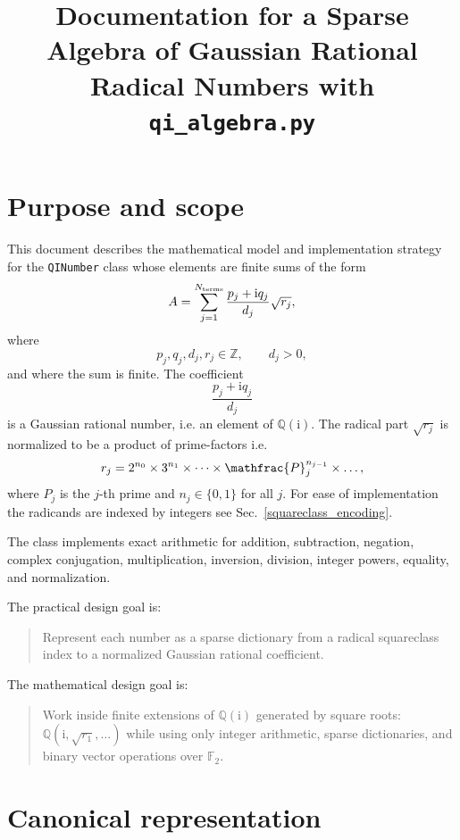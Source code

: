 \documentclass[11pt]{article}
\title{Documentation for a Sparse Algebra of Gaussian Rational Radical Numbers with \texttt{qi\_algebra.py}}
\author{}
\date{}
\newcommand{\QQ}{\mathbb{Q}}
\newcommand{\ZZ}{\mathbb{Z}}
\newcommand{\FF}{\mathbb{F}}
\newcommand{\ii}{\mathrm{i}}
\begin{document}
\maketitle

\section{Purpose and scope}

This document describes the mathematical model and implementation strategy for the \texttt{QINumber} class whose elements are finite sums of the form
\begin{equation}
  A = \sum_{j = 1}^{N_{\rm terms}} \frac{p_j + \ii q_j}{d_j}\sqrt{r_j},
\end{equation}
where
\[
  p_j,q_j,d_j,r_j \in \ZZ, \qquad d_j>0,
\]
and where the sum is finite. The coefficient
\[
  \frac{p_j+\ii q_j}{d_j}
\]
is a Gaussian rational number, i.e. an element of \(\QQ(\ii)\). The radical part \(\sqrt{r_j}\) is normalized to be a product of prime-factors i.e.
\begin{equation}
\label{eq:1}
r_j = 2^{n_{0}} \times 3^{n_1} \times \dots \times \mathfrac{P}_j^{n_{j-1}} \times \dots,
\end{equation}
where $P_j$ is the $j$-th prime and $n_{j} \in \{0, 1\}$ for all $j$. For ease of implementation the radicands are indexed by integers see Sec.~\ref{squareclass_encoding}.

The class implements exact arithmetic for addition, subtraction, negation, complex conjugation, multiplication, inversion, division, integer powers, equality, and normalization.

The practical design goal is:
\begin{quote}
Represent each number as a sparse dictionary from a radical squareclass index to a normalized Gaussian rational coefficient.
\end{quote}

The mathematical design goal is:
\begin{quote}
Work inside finite extensions of \(\QQ(\ii)\) generated by square roots: \(\QQ(\ii, \sqrt{r_1}, \dots )\) while using only integer arithmetic, sparse dictionaries, and binary vector operations over \(\FF_2\).
\end{quote}

\section{Canonical representation}
\end{document}
